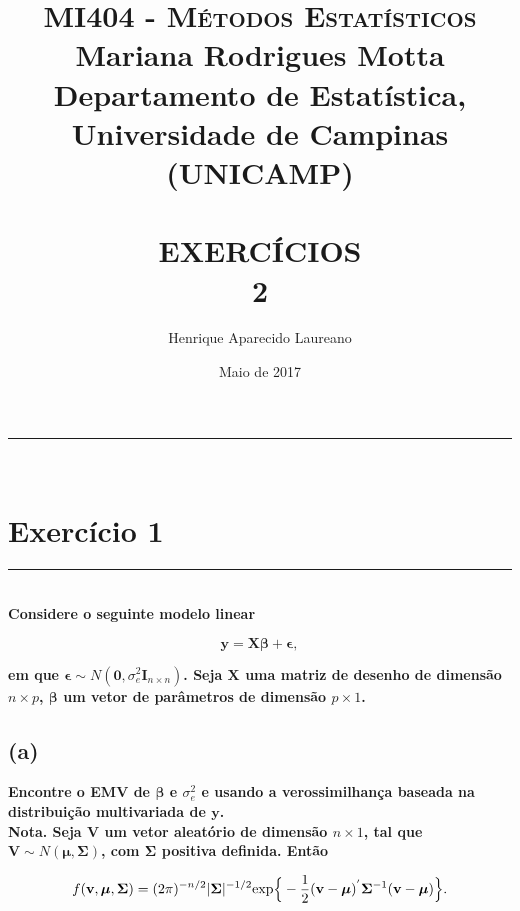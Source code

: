 \documentclass[12pt, oldfontcommands]{article}\usepackage[]{graphicx}\usepackage[]{color}
\title{  
 \normalfont \normalsize 
 \textsc{MI404 - Métodos Estatísticos} \\
 Mariana Rodrigues Motta \\
 Departamento de Estatística, Universidade de Campinas (UNICAMP) \\[25pt]
 \horrule{.5pt} \\ [.4cm]
 \LARGE EXERCÍCIOS \\
  2
 \horrule{2pt} \\[ .5cm]}
\author{Henrique Aparecido Laureano}
\date{\normalsize Maio de 2017}
\newcommand{\horrule}[1]{\rule{\linewidth}{#1}}
\begin{document}
\maketitle

\vspace{\fill}

\tableofcontents

\horrule{1pt} \\

\newpage

\section*{Exercício 1} 

\horrule{1pt} \\

\textbf{Considere o seguinte modelo linear}

\begin{equation}
 \mathbf{y} = \mathbf{X} \bm{\beta} + \bm{\epsilon},
 \label{eq:exer1_1}
\end{equation}

\textbf{em que \(\bm{\epsilon} \sim N(\mathbf{0},
                 \sigma_{e}^{2}\mathbf{I}_{n \times n})\). Seja 
        \(\mathbf{X}\) uma matriz de desenho de dimensão \(n \times p\),
        \(\bm{\beta}\) um vetor de parâmetros de dimensão
        \(p \times 1\).}

\subsection*{(a)} 

\textbf{Encontre o EMV de \(\bm{\beta}\) e \(\sigma_{e}^{2}\) e usando a
        verossimilhança baseada na distribuição multivariada de   
        \(\mathbf{y}\).} \\

\textbf{Nota. Seja \(\mathbf{V}\) um vetor aleatório de dimensão
        \(n \times 1\), tal que
        \(\mathbf{V} \sim N(\bm{\mu}, \bm{\Sigma})\), com
        \(\bm{\Sigma}\) positiva definida. Então}

\begin{equation}
 f(\mathbf{v}, \bm{\mu}, \bm{\Sigma}) =
 (2 \pi)^{-n/2} |\bm{\Sigma}|^{-1/2} {\rm exp}\Big\{-\frac{1}{2}
 (\mathbf{v} - \bm{\mu})^{'} \bm{\Sigma}^{-1} (\mathbf{v} - \bm{\mu})
 \Big\}.
 \label{eq:exer1_2}
\end{equation}
\end{document}
